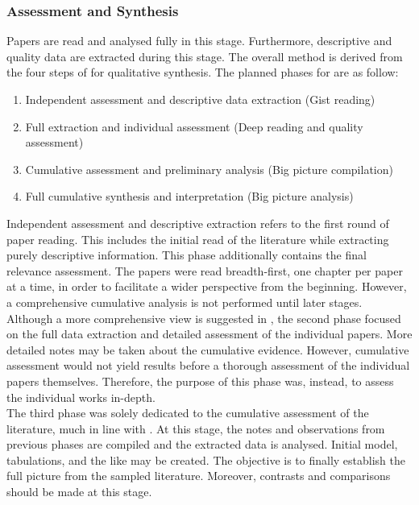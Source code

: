 \documentclass{article}
\begin{document}
\subsubsection{Assessment and Synthesis}

Papers are read and analysed fully in this stage. Furthermore, descriptive and quality data are extracted during this stage. The overall method is derived from the four steps of \cite[pp.~222-224]{booth2012} for qualitative synthesis. The planned phases for are as follow:

    \begin{enumerate}
        \item Independent assessment and descriptive data extraction (Gist reading)
        \item Full extraction and individual assessment (Deep reading and quality assessment)
        \item Cumulative assessment and preliminary analysis (Big picture compilation)
        \item Full cumulative synthesis and interpretation (Big picture analysis)
    \end{enumerate}

\noindent Independent assessment and descriptive extraction refers to the first round of paper reading. This includes the initial read of the literature while extracting purely descriptive information\cite[p.~222]{booth2012}. This phase additionally contains the final relevance assessment. The papers were read breadth-first, one chapter per paper at a time, in order to facilitate a wider perspective from the beginning. However, a comprehensive cumulative analysis is not performed until later stages.\\

\noindent Although a more comprehensive view is suggested in \cite[p.~223]{booth2012}, the second phase focused on the full data extraction and detailed assessment of the individual papers. More detailed notes may be taken about the cumulative evidence. However, cumulative assessment would not yield results before a thorough assessment of the individual papers themselves. Therefore, the purpose of this phase was, instead, to assess the individual works in-depth.\\

\noindent The third phase was solely dedicated to the cumulative assessment of the literature, much in line with \cite[p~.223]{booth2012}. At this stage, the notes and observations from previous phases are compiled and the extracted data is analysed. Initial model, tabulations, and the like may be created. The objective is to finally establish the full picture from the sampled literature. Moreover, contrasts and comparisons should be made at this stage.\\
\end{document}
